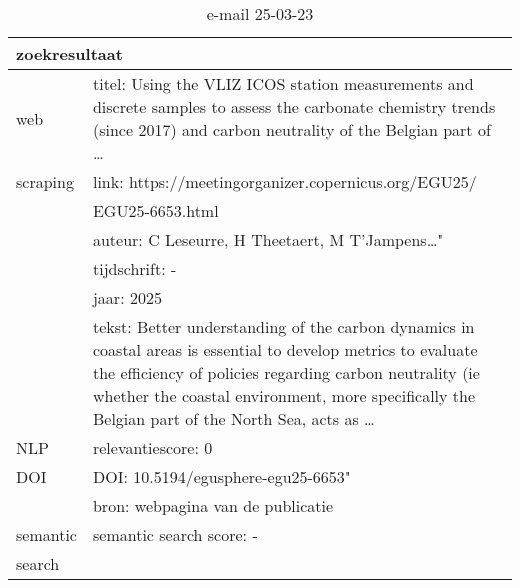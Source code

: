 \begin{table}[h!]
    \caption{e-mail 25-03-23}
    \centering
    \begin{tabularx}{\textwidth}{|p{4cm}|X|} 
        \hline
        \multicolumn{2}{|X|}{\textbf{zoekresultaat}} \\
        \hline
        web &titel: Using the VLIZ ICOS station measurements and discrete samples to assess the carbonate chemistry trends (since 2017) and carbon neutrality of the Belgian part of …\\
        scraping&link: https://meetingorganizer.copernicus.org/EGU25/\\&EGU25-6653.html\\
        &auteur: C Leseurre, H Theetaert, M T'Jampens…"\\
        &tijdschrift: -\\
        &jaar: 2025\\
        &tekst: Better understanding of the carbon dynamics in coastal areas is essential to develop metrics to evaluate the efficiency of policies regarding carbon neutrality (ie whether the coastal environment, more specifically the Belgian part of the North Sea, acts as …\\
        \hline
        NLP&relevantiescore: 0\\
        \hline
        DOI&DOI: 10.5194/egusphere-egu25-6653"\\
        &bron: webpagina van de publicatie\\
        \hline
        semantic&semantic search score: -\\
        search&\\
        \hline
    \end{tabularx}
    \label{table:email20250323}
\end{table}
